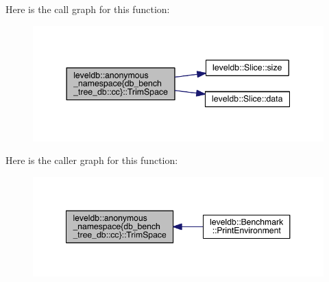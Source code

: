 Here is the call graph for this function\+:
\nopagebreak
\begin{figure}[H]
\begin{center}
\leavevmode
\includegraphics[width=344pt]{namespaceleveldb_1_1anonymous__namespace_02db__bench__tree__db_8cc_03_a93284ee2843d98541100a7212540d54c_cgraph}
\end{center}
\end{figure}




Here is the caller graph for this function\+:
\nopagebreak
\begin{figure}[H]
\begin{center}
\leavevmode
\includegraphics[width=348pt]{namespaceleveldb_1_1anonymous__namespace_02db__bench__tree__db_8cc_03_a93284ee2843d98541100a7212540d54c_icgraph}
\end{center}
\end{figure}


